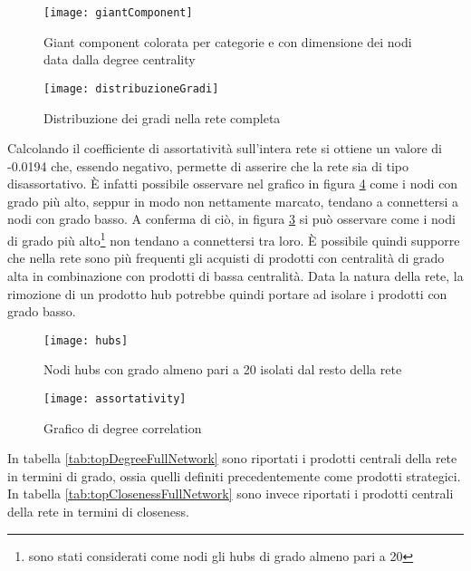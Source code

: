\begin{figure}[]
    \texttt{[image: giantComponent]}\centering
    \caption{Giant component colorata per categorie e con dimensione dei nodi data dalla degree centrality}\label{fig:giantComponent}
\end{figure}

\begin{figure}[H]
    \texttt{[image: distribuzioneGradi]}\centering
    \caption{Distribuzione dei gradi nella rete completa}\label{fig:distribuzioneGradi}
\end{figure}

Calcolando il coefficiente di assortatività sull'intera rete si ottiene un valore di -0.0194 che, essendo negativo, permette di asserire che la rete sia di tipo disassortativo. È infatti possibile osservare nel grafico in figura \ref{fig:assortativity} come i nodi  con grado più alto, seppur in modo non nettamente marcato, tendano a connettersi a nodi con grado basso. A conferma di ciò, in figura \ref{fig:hubs} si può osservare come i nodi di grado più alto\footnote{sono stati considerati come nodi gli hubs di grado almeno pari a 20} non tendano a connettersi tra loro. È possibile quindi supporre che nella rete sono più frequenti gli acquisti di prodotti con centralità di grado alta in combinazione con prodotti di bassa centralità. Data la natura della rete, la rimozione di un prodotto hub potrebbe quindi portare ad isolare i prodotti con grado basso.

\begin{figure}[H]
    \texttt{[image: hubs]}\centering
    \caption{Nodi hubs con grado almeno pari a 20 isolati dal resto della rete}\label{fig:hubs}
\end{figure}

\begin{figure}[H]
    \texttt{[image: assortativity]}\centering
    \caption{Grafico di degree correlation}\label{fig:assortativity}
\end{figure}

In tabella \ref{tab:topDegreeFullNetwork} sono riportati i prodotti centrali della rete in termini di grado, ossia quelli definiti precedentemente come prodotti strategici. \\
In tabella \ref{tab:topClosenessFullNetwork} sono invece riportati i prodotti centrali della rete in termini di closeness. \\

